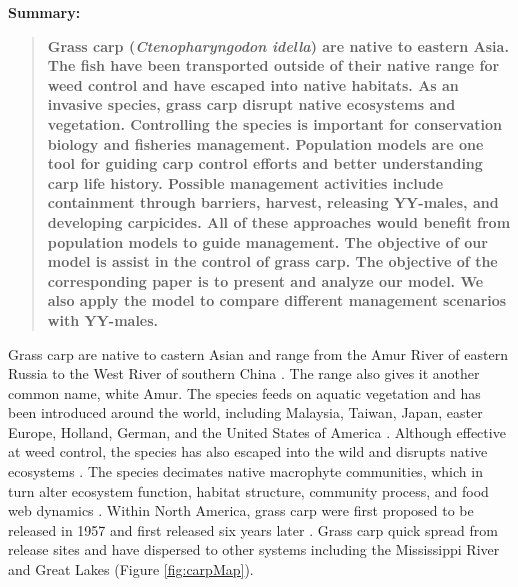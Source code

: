 \documentclass{article}[12pt]
\begin{document}
\textbf{Summary:}
\begin{verse}
\textbf{
Grass carp (\textit{Ctenopharyngodon idella}) are native to eastern Asia.
The fish have been transported outside of their native range for weed control and have escaped into native habitats. 
As an invasive species, grass carp disrupt native ecosystems and vegetation. 
Controlling the species is important for conservation biology and fisheries management. 
Population models are one tool for guiding carp control efforts and better understanding carp life history. 
Possible management activities include containment through barriers, harvest, releasing YY-males, and developing carpicides.  
All of these approaches would benefit from population models to guide management. 
The objective of our model is assist in the control of grass carp. 
The objective of the corresponding paper is to present and analyze our model.
We also apply the model to compare different management scenarios with YY-males.
}
\end{verse}

Grass carp are native to castern Asian and range from the Amur River of eastern Russia to the West River of southern China \citep{shireman1983synopsis}.
The range also gives it another common name, white Amur.
The species feeds on aquatic vegetation and has been introduced around the world, including Malaysia, Taiwan, Japan, easter Europe, Holland, German, and the United States of America \citep{cross1969aquatic}.
Although effective at weed control, the species has also escaped into the wild and disrupts native ecosystems \citep{chapman2013first}.
The species decimates native macrophyte communities, which in turn alter ecosystem function, habitat structure, community process, and food web dynamics \citep{dibble2009ecological}.
Within North America, grass carp were first proposed to be released in 1957 \citep{swingle:1957} and first released six years later \citep{bain1993assessing}.
Grass carp quick spread from release sites and have dispersed to other  systems including the Mississippi River \citep{bain1993assessing} and Great Lakes \citep{chapman2013first} (Figure \ref{fig:carpMap}).
\end{document}
